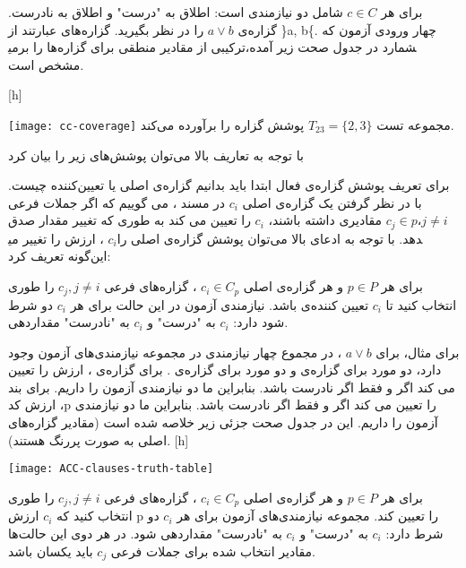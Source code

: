 برای هر 
$c \in C$
 شامل دو نیازمندی است: اطلاق  به "درست" و اطلاق  به نادرست. گزاره‌ی
$a \vee b$
  را در نظر بگیرید. گزاره‌های  عبارتند از \}a, b\{. چهار ورودی آزمون که ترکیبی از مقادیر منطقی برای گزاره‌ها را برمی‎شمارد در جدول صحت زیر آمده، مشخص است.

[h]
\raggedright
\texttt{[image: cc-coverage]}
\vspace{0.1em}
مجموعه تست 
$T_{23} = \{2, 3\}$
 پوشش گزاره را برآورده می‌کند.

با توجه به تعاریف بالا می‌توان پوشش‌های زیر را بیان کرد

برای تعریف پوشش گزاره‌ی فعال ابتدا باید بدانیم گزاره‌ی اصلی یا تعیین‌کننده چیست. با در نظر گرفتن یک گزاره‌ی اصلی 
$c_i$
 در مسند ، می گوییم که اگر جملات فرعی
$c_j \in p، j \neq i$
 مقادیری داشته باشند، 
 $c_i$
  را تعیین می کند به طوری که تغییر مقدار صدق 
$c_i$
 ، ارزش  را تغییر می‎دهد. با توجه به ادعای بالا می‌توان پوشش گزاره‌ی اصلی را این‌گونه تعریف کرد:
 
برای هر
$p \in P$
 و هر گزاره‌ی اصلی 
$c_i \in C_p$
، گزاره‌های فرعی
$c_j, j \neq i$
را طوری انتخاب کنید تا
$c_i$
 تعیین کننده‌ی  باشد. نیازمندی آزمون در این حالت برای هر
$c_i$
 دو شرط دارد: 
$c_i$
 به "درست" و 
$c_i$
 به "نادرست" مقداردهی ‎شود.
 
 برای مثال، برای
$a \vee b$
  ، در مجموع چهار نیازمندی در مجموعه نیازمندی‌های آزمون وجود دارد، دو مورد برای گزاره‌ی  و دو مورد برای گزاره‌ی . برای گزاره‌ی ،  ارزش  را تعیین می کند اگر و فقط اگر  نادرست باشد. بنابراین ما دو نیازمندی آزمون 
   را داریم. برای بند ،  ارزش کد{p} را تعیین می کند اگر و فقط اگر  نادرست باشد. بنابراین ما دو نیازمندی آزمون 
 را داریم. این در جدول صحت جزئی زیر خلاصه شده است (مقادیر گزاره‌های اصلی به صورت پررنگ هستند).
[h]
\raggedright
\texttt{[image: ACC-clauses-truth-table]}
\vspace{0.1em}

برای هر 
$p \in P$
 و هر گزاره‌ی اصلی 
$c_i\in C_p$
 ، گزاره‌های فرعی
$c_j, j \neq i$
 را طوری انتخاب کنید که 
$c_i$
 ارزش p را تعیین کند. مجموعه نیازمندی‌های آزمون برای هر
$c_i$
 دو شرط دارد: 
$c_i$
 به "درست" و 
$c_i$
 به "نادرست" مقداردهی شود. در هر دوی این حالت‌ها مقادیر انتخاب شده برای جملات فرعی 
$c_j$
 باید یکسان باشد.
 
